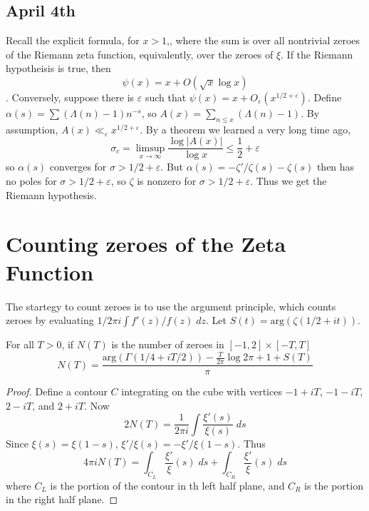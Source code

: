 \section{April 4th}

Recall the explicit formula, for $x > 1$,,
%
%
where the sum is over all nontrivial zeroes of the Riemann zeta function, equivalently, over the zeroes of $\xi$. If the Riemann hypotheisis is true, then
%
\[ \psi(x) = x + O(\sqrt{x} \log x) \]. Conversely, suppose there is $\varepsilon$ such that $\psi(x) = x + O_\varepsilon(x^{1/2 + \varepsilon})$. Define $\alpha(s) = \sum (\Lambda(n) - 1)n^{-s}$, so $A(x) = \sum_{n \leq x} (\Lambda(n) - 1)$. By assumption, $A(x) \ll_\varepsilon x^{1/2 + \varepsilon}$. By a theorem we learned a very long time ago,
%
\[ \sigma_c = \limsup_{x \to \infty} \frac{\log |A(x)|}{\log x} \leq \frac{1}{2} + \varepsilon \]
%
so $\alpha(s)$ converges for $\sigma > 1/2 + \varepsilon$. But $\alpha(s) = -\zeta'/\zeta(s) - \zeta(s)$ then has no poles for $\sigma > 1/2 + \varepsilon$, so $\zeta$ is nonzero for $\sigma > 1/2 + \varepsilon$. Thus we get the Riemann hypothesis.

\chapter{Counting zeroes of the Zeta Function}

The startegy to count zeroes is to use the argument principle, which counts zeroes by evaluating $1/2\pi i \int f'(z)/f(z)\; dz$. Let $S(t) = \text{arg}(\zeta(1/2 + it))$.

\begin{theorem}
    For all $T > 0$, if $N(T)$ is the number of zeroes in $[-1,2] \times [-T,T]$
    \[ N(T) = \frac{\text{arg}(\Gamma(1/4 + i T/2)) - \frac{T}{2 \pi} \log 2 \pi + 1 + S(T)}{\pi} \]
\end{theorem}
\begin{proof}
    Define a contour $C$ integrating on the cube with vertices $-1 + iT$, $-1 - iT$, $2 - iT$, and $2 + iT$. Now
    \[ 2N(T) = \frac{1}{2\pi i} \int \frac{\xi'(s)}{\xi(s)}\; ds \]
    Since $\xi(s) = \xi(1-s)$, $\xi'/\xi(s) = - \xi'/\xi(1-s)$. Thus
    \[ 4 \pi i N(T) = \int_{C_L} \frac{\xi'}{\xi}(s)\; ds + \int_{C_R} \frac{\xi'}{\xi}(s)\; ds \]
    where $C_L$ is the portion of the contour in th left half plane, and $C_R$ is the portion in the right half plane.
\end{proof}

